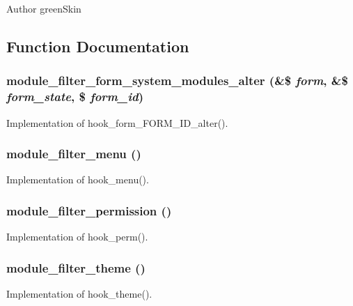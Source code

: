 \begin{DoxyAuthor}{Author}
greenSkin 
\end{DoxyAuthor}


\subsection{Function Documentation}
\hypertarget{module__filter_8module_aac9264bd5392b27f02a2d1c8f9e01ab4}{
\subsubsection[{module\_\-filter\_\-form\_\-system\_\-modules\_\-alter}]{\setlength{\rightskip}{0pt plus 5cm}module\_\-filter\_\-form\_\-system\_\-modules\_\-alter (\&\$ {\em form}, \/  \&\$ {\em form\_\-state}, \/  \$ {\em form\_\-id})}}
\label{module__filter_8module_aac9264bd5392b27f02a2d1c8f9e01ab4}
Implementation of hook\_\-form\_\-FORM\_\-ID\_\-alter(). \hypertarget{module__filter_8module_a050928e7cb73c7a13c98238938fd4870}{
\subsubsection[{module\_\-filter\_\-menu}]{\setlength{\rightskip}{0pt plus 5cm}module\_\-filter\_\-menu ()}}
\label{module__filter_8module_a050928e7cb73c7a13c98238938fd4870}
Implementation of hook\_\-menu(). \hypertarget{module__filter_8module_a56a363584cb3cf1fb9e77576ff2084e1}{
\subsubsection[{module\_\-filter\_\-permission}]{\setlength{\rightskip}{0pt plus 5cm}module\_\-filter\_\-permission ()}}
\label{module__filter_8module_a56a363584cb3cf1fb9e77576ff2084e1}
Implementation of hook\_\-perm(). \hypertarget{module__filter_8module_a100b5ac9f4415c026e19b3a79198d5ae}{
\subsubsection[{module\_\-filter\_\-theme}]{\setlength{\rightskip}{0pt plus 5cm}module\_\-filter\_\-theme ()}}
\label{module__filter_8module_a100b5ac9f4415c026e19b3a79198d5ae}
Implementation of hook\_\-theme(). 